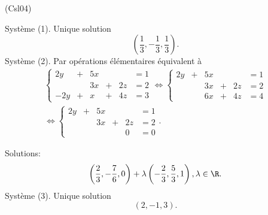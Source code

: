 \begin{tiny}(Csl04)\end{tiny}
Système (1). Unique solution
\[
  \left( \frac{1}{3}, -\frac{1}{3}, \frac{1}{3}\right). 
\]
Système (2). Par opérations élémentaires équivalent à
\begin{multline*}
  \left\lbrace 
  \begin{alignedat}{4}
    2y &+& 5x & &    &= 1\\
       & & 3x &+& 2z &= 2\\
   -2y &+& x  &+& 4z &= 3    
  \end{alignedat}
  \right.
\Leftrightarrow
  \left\lbrace 
  \begin{alignedat}{4}
    2y &+& 5x & &    &= 1\\
       & & 3x &+& 2z &= 2\\
       & & 6x &+& 4z &= 4    
  \end{alignedat}
  \right. \\
\Leftrightarrow
  \left\lbrace 
  \begin{alignedat}{4}
    2y &+& 5x & &    &= 1\\
       & & 3x &+& 2z &= 2\\
       & &    & & 0  &= 0    
  \end{alignedat}
  \right. .
\end{multline*}

Solutions:
\[
  \left( \frac{2}{3}, -\frac{7}{6}, 0\right) + \lambda\left( -\frac{2}{3}, \frac{5}{3}, 1\right), \lambda \in \R. 
\]
Système (3). Unique solution
\[
  (2,-1,3).
\]

